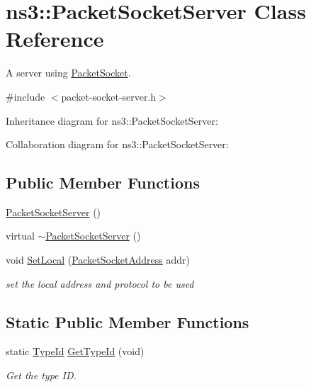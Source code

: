 \hypertarget{classns3_1_1PacketSocketServer}{}\section{ns3\+:\+:Packet\+Socket\+Server Class Reference}
\label{classns3_1_1PacketSocketServer}


A server using \hyperlink{classns3_1_1PacketSocket}{Packet\+Socket}.  




{\ttfamily \#include $<$packet-\/socket-\/server.\+h$>$}



Inheritance diagram for ns3\+:\+:Packet\+Socket\+Server\+:


Collaboration diagram for ns3\+:\+:Packet\+Socket\+Server\+:
\subsection*{Public Member Functions}
\begin{DoxyCompactItemize}
\item 
\hyperlink{classns3_1_1PacketSocketServer_aa26538176e9cd3dd0ce2917833abe736}{Packet\+Socket\+Server} ()
\item 
virtual \hyperlink{classns3_1_1PacketSocketServer_a26cd48005975f67fbfb7e1546dcd2184}{$\sim$\+Packet\+Socket\+Server} ()
\item 
void \hyperlink{classns3_1_1PacketSocketServer_a89207b49054571b480ee1d26934907d3}{Set\+Local} (\hyperlink{classns3_1_1PacketSocketAddress}{Packet\+Socket\+Address} addr)
\begin{DoxyCompactList}\small\item\em set the local address and protocol to be used \end{DoxyCompactList}\end{DoxyCompactItemize}
\subsection*{Static Public Member Functions}
\begin{DoxyCompactItemize}
\item 
static \hyperlink{classns3_1_1TypeId}{Type\+Id} \hyperlink{classns3_1_1PacketSocketServer_a42ee331241cef8af74eb597ad1e9193d}{Get\+Type\+Id} (void)
\begin{DoxyCompactList}\small\item\em Get the type ID. \end{DoxyCompactList}\end{DoxyCompactItemize}
